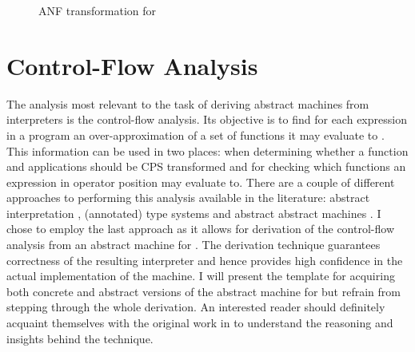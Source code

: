 \begin{figure}
\begin{center}
\begin{tabular}{rll}
\end{tabular}
\endgroup
\end{center}
\caption{ANF transformation for \IDL{}}
\label{fig:transformer-anf}
\end{figure}


\section{Control-Flow Analysis}\label{sec:transformer-cfa}
The analysis most relevant to the task of deriving abstract machines from interpreters is the control-flow analysis.
Its objective is to find for each expression in a program an over-approximation of a set of functions it may evaluate to \cite{popa}.
This information can be used in two places: when determining whether a function and applications should be CPS transformed and for checking which functions an expression in operator position may evaluate to.
There are a couple of different approaches to performing this analysis available in the literature: abstract interpretation \cite{popa}, (annotated) type systems \cite{popa} and abstract abstract machines \cite{aam}.
I chose to employ the last approach as it allows for derivation of the control-flow analysis from an abstract machine for \IDL{}.
The derivation technique guarantees correctness of the resulting interpreter and hence provides high confidence in the actual implementation of the machine.
I will present the template for acquiring both concrete and abstract versions of the abstract machine for \IDL{} but refrain from stepping through the whole derivation.
An interested reader should definitely acquaint themselves with the original work in \cite{aam} to understand the reasoning and insights behind the technique.

